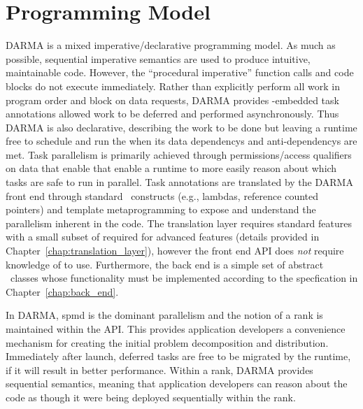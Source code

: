 
\section{Programming Model}
\label{sec:programming_model}
DARMA is a mixed \gls{imperative}/\gls{declarative} \gls{programming model}.
As much as possible, sequential imperative semantics are used to produce intuitive, maintainable code.
However, the ``procedural imperative'' function calls and code blocks do not execute immediately.
Rather than explicitly perform all work in program order and block on data requests,
 DARMA provides \CC-embedded task annotations allowed work to be
 deferred and performed asynchronously.
Thus DARMA is also declarative, describing the work to be done but leaving a runtime free to schedule and run the when its data \glspl{dependency} and
\glspl{anti-dependency} are met.  
Task parallelism is primarily achieved through permissions/access qualifiers
on data that enable that enable a runtime to more easily reason about which tasks are safe to run in parallel. 
Task annotations are translated by
the DARMA front end through standard \CC\ constructs (e.g., lambdas,
  reference counted pointers) and \gls{template
metaprogramming} to expose and understand the parallelism inherent in the code.  
The \gls{translation layer} requires  standard features with a small subset of
 required for advanced features (details provided in
    Chapter~\ref{chap:translation_layer}), 
  however the \gls{front end} \gls{API} does \emph{not}
require knowledge of  to use. Furthermore, the \gls{back end} is a
simple set of abstract \CC\ classes whose functionality must be implemented
according to the specfication in Chapter~\ref{chap:back_end}.


In DARMA, \gls{spmd} is the dominant parallelism and the notion of a \gls{rank}
is maintained within the \gls{API}.   
This provides application developers a convenience mechanism for creating
the initial problem decomposition and distribution.  Immediately after launch, deferred tasks
are free to be migrated by the runtime, if it will result in
better performance. 
Within a \gls{rank}, DARMA provides \gls{sequential semantics}, 
meaning that application developers can reason about the code as
though it were being deployed sequentially within the rank.   


